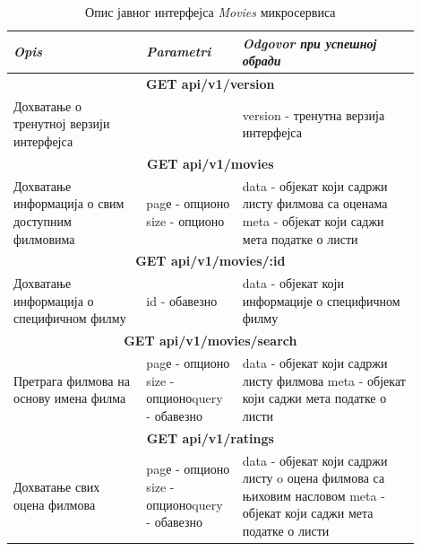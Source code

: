 \documentclass[12pt,oneside]{memoir}
\begin{document}
\begin{table}
\caption{Опис јавног интерфејса \textit{Movies} микросервиса}
\label{tbl:moviesAPI}
\begin{center}
\begin{tabular}{ |  p{0.3\linewidth} | p{0.2\linewidth}|  p{0.4\linewidth} | }
 
 \hline
  \textit{Opis} & \textit{Parametri} & \textit{Odgovor при успешној обради} \\
  \hline
  \multicolumn{3}{|c|}{\textbf{GET api/v1/version}} \\
  \hline
  Дохватање о тренутној верзији интерфејса
  & 
  
  & 
 version - тренутна верзија интерфејса \\
  \hline
 \multicolumn{3}{|c|}{\textbf{GET api/v1/movies}} \\
  \hline
  Дохватање информација о свим доступним филмовима
  & 
  pagе - опционо \newline size - опционо
  & 
  data - објекат који садржи листу филмова са оценама \newline  meta - објекат који саджи мета податке о листи \\
  \hline
   \multicolumn{3}{|c|}{\textbf{GET api/v1/movies/:id}} \\
  \hline
  Дохватање информација о специфичном филму 
  & 
  id - обавезно
  & 
  data - објекат који информације о специфичном филму\\
  \hline
   \multicolumn{3}{|c|}{\textbf{GET api/v1/movies/search}} \\
  \hline
  Претрага филмова на основу имена филма
  & 
  pagе - опционо \newline size - опционо\newline query - обавезно
  & 
  data - објекат који садржи листу филмова \newline  meta - објекат који саджи мета податке о листи \\
   \hline
     \multicolumn{3}{|c|}{\textbf{GET api/v1/ratings}} \\
  \hline
 Дохватање свих оцена филмова
  & 
  pagе - опционо \newline size - опционо\newline query - обавезно
  & 
  data - објекат који садржи листу o оцена филмова са њиховим насловом \newline  meta - објекат који саджи мета податке о листи \\ 
  \hline
\end{tabular}
\end{center}
\end{table}
\end{document}

